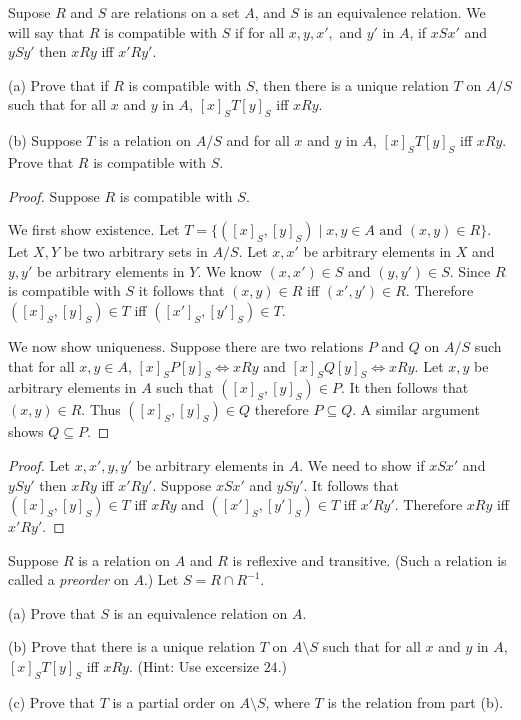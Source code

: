 \begin{tcolorbox}[title=Problem 24, breakable]
    Supose $R$ and $S$ are relations on a set $A$, and $S$
    is an equivalence relation.
    We will say that $R$ is compatible with $S$ if for all $x, y, x',$ and 
    $y'$ in $A$, if $xSx'$ and $ySy'$ then $xRy$ iff $x'Ry'$.

    (a) Prove that if $R$ is compatible with $S$,
        then there is a unique relation $T$ on $A / S$
        such that for all $x$ and $y$ in $A$, $[x]_S T[y]_S$ iff $xRy$.

    (b) Suppose $T$ is a relation on $A / S$ and for all $x$
        and $y$ in $A$, $[x]_S T [y]_S$ iff $xRy$.
        Prove that $R$ is compatible with $S$.
\end{tcolorbox}

\begin{proof}
    Suppose $R$ is compatible with $S$.

    We first show existence.
    Let $T = \{([x]_S, [y]_S) \mid x, y \in A \text{ and } (x, y) \in R\}$.
    Let $X, Y$ be two arbitrary sets in $A / S$.
    Let $x, x'$ be arbitrary elements in $X$
        and $y, y'$ be arbitrary elements in $Y$.
    We know $(x, x') \in S$ and $(y, y') \in S$.
    Since $R$ is compatible with $S$ it follows that 
        $(x, y) \in R$ iff $(x', y') \in R$.
    Therefore $([x]_S, [y]_S) \in T$ iff $([x']_S, [y']_S) \in T$.

    We now show uniqueness.
    Suppose there are two relations $P$ and $Q$ on $A / S$
    such that for all $x, y \in A$,
    $[x]_S P [y]_S \iff xRy$ and $[x]_S Q [y]_S \iff xRy$.
    Let $x, y$ be arbitrary elements in $A$
        such that $([x]_S, [y]_S) \in P$.
    It then follows that $(x, y) \in R$.
    Thus $([x]_S, [y]_S) \in Q$ therefore $P \subseteq Q$. 
    A similar argument shows $Q \subseteq P$.
\end{proof}

\begin{proof}
    Let $x, x', y, y'$ be arbitrary elements in $A$.
    We need to show if $xSx'$ and $ySy'$ then $xRy$ iff $x'Ry'$.
    Suppose $xSx'$ and $ySy'$.
    It follows that $([x]_S, [y]_S) \in T$ iff $xRy$
        and $([x']_S, [y']_S) \in T$ iff $x'Ry'$.
    Therefore $xRy$ iff $x'Ry'$.
\end{proof}

\begin{tcolorbox}[title=Problem 25, breakable]
    Suppose $R$ is a relation on $A$ and $R$ is reflexive and transitive.
    (Such a relation is called a \emph{preorder} on $A$.) Let $S = R \cap R^{-1}$.

    (a) Prove that $S$ is an equivalence relation on $A$.

    (b) Prove that there is a unique relation $T$ on $A \setminus S$ such that 
        for all $x$ and $y$ in $A$, $[x]_S T[y]_S$ iff $xRy$. (Hint: Use excersize $24$.)

    (c) Prove that $T$ is a partial order on $A \setminus S$, where $T$ is the relation 
        from part (b).
\end{tcolorbox}

